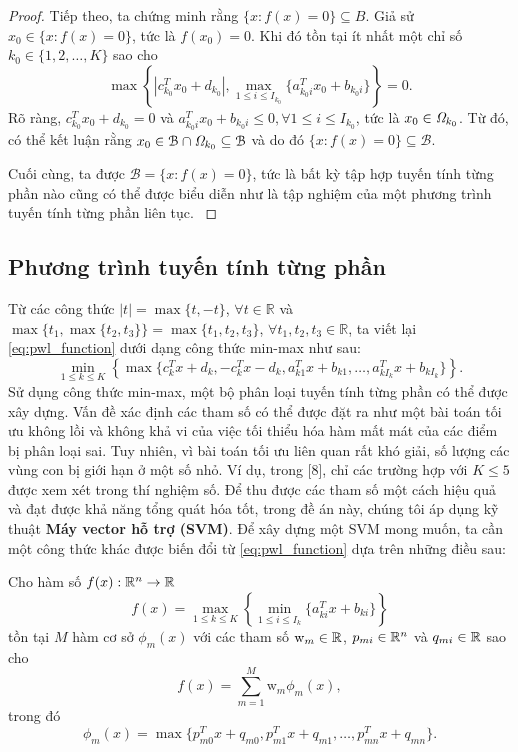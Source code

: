 \begin{proof}
    Tiếp theo, ta chứng minh rằng \( \{ x : f(x) = 0 \} \subseteq B \). Giả sử \( x_0 \in \{ x : f(x) = 0 \} \),
    tức là \( f(x_0) = 0 \). Khi đó tồn tại ít nhất một chỉ số \( k_0 \in \{ 1, 2, \ldots, K \} \) sao cho
    \[
    \max \left\{ |c_{k_0}^T x_0 + d_{k_0}|, \max_{1 \leq i \leq I_{k_0}} \{ a_{k_0i}^T x_0 + b_{k_0i} \} \right\} = 0.
    \]
    Rõ ràng, \( c_{k_0}^T x_0 + d_{k_0} = 0 \) và \( a_{k_0i}^T x_0 + b_{k_0i} \leq 0, \forall 1 \leq i \leq I_{k_0} \), tức là \( x_0 \in \mathit{\Omega}_{k_0} \).
    Từ đó, có thể kết luận rằng \( x_0 \in \mathcal{B} \cap \mathit{\Omega}_{k_0} \subseteq \mathcal{B} \) và do đó
    \( \{ x : f(x) = 0 \} \subseteq \mathcal{B} \).

    Cuối cùng, ta được \( \mathcal{B} = \{ x : f(x) = 0 \} \), tức là bất kỳ tập hợp tuyến tính từng phần nào cũng có thể được biểu diễn như là tập nghiệm của một phương trình tuyến tính từng phần liên tục.
    \label{thm:pwl_set}
\end{proof}

\subsection{Phương trình tuyến tính từng phần}
Từ các công thức \sloppy \( |t| = \max\{t, -t\}\), \( \forall t \in \mathbb{R} \) và \( \max\{t_1, \max\{t_2, t_3\}\} = \max\{t_1, t_2, t_3\}\), \( \forall t_1, t_2, t_3 \in \mathbb{R} \), ta viết lại \eqref{eq:pwl_function} dưới dạng công thức min-max như sau:
\[
\min_{1 \leq k \leq K} \left\{ \max \{ c_k^T x + d_k, -c_k^T x - d_k, a_{k1}^T x + b_{k1}, \ldots, a_{kI_k}^T x + b_{kI_k} \} \right\}.
\]
Sử dụng công thức min-max, một bộ phân loại tuyến tính từng phần có thể được xây dựng. Vấn đề xác định các tham số có thể được đặt ra như một bài toán tối ưu không lồi và không khả vi của việc tối thiểu hóa hàm mất mát của các điểm bị phân loại sai. Tuy nhiên, vì bài toán tối ưu liên quan rất khó giải, số lượng các vùng con bị giới hạn ở một số nhỏ. Ví dụ, trong [8], chỉ các trường hợp với \( K \leq 5 \) được xem xét trong thí nghiệm số.
Để thu được các tham số một cách hiệu quả và đạt được khả năng tổng quát hóa tốt, trong đề án này, chúng tôi áp dụng kỹ thuật \textbf{Máy vector hỗ trợ (SVM)}. Để xây dựng một SVM mong muốn, ta cần một công thức khác được biến đổi từ \eqref{eq:pwl_function} dựa trên những điều sau:

\begin{lemma}
    Cho hàm số \( f(x): \mathbb{R}^n \to \mathbb{R} \)
    \[
    f(x) = \max_{1 \leq k \leq K} \left\{ \min_{1 \leq i \leq I_k} \{ a_{ki}^T x + b_{ki} \} \right\}
    \]
    tồn tại \(M\) hàm cơ sở \( \phi_m(x) \) với các tham số \(\text{w}_m \in \mathbb{R}\), \(p_{mi} \in \mathbb{R}^n\) và \( q_{mi} \in \mathbb{R} \) sao cho
    \[
    f(x) = \displaystyle{\sum_{m=1}^{M}} \text{w}_m \phi_m(x),
    \]
    trong đó
    \[
    \phi_m(x) = \max \{ p_{m0}^T x + q_{m0}, p_{m1}^T x + q_{m1}, \ldots , p_{mn}^T x + q_{mn}\}.
    \]
    \label{lemma:wang_and_sun}
\end{lemma}

